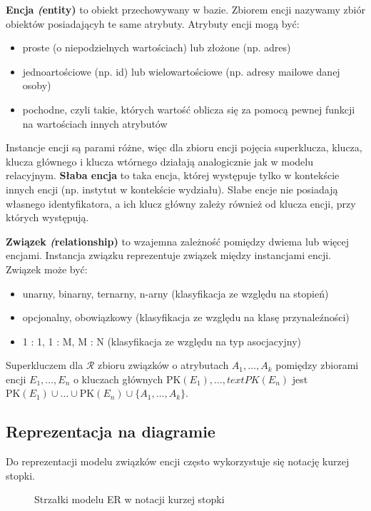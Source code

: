 \textbf{Encja \textit(entity)} to obiekt przechowywany w bazie. Zbiorem encji nazywamy zbiór obiektów posiadającyh te same atrybuty.
Atrybuty encji mogą być:
\begin{itemize}
    \item proste (o niepodzielnych wartościach) lub złożone (np. adres)
    \item jednoartościowe (np. id) lub wielowartościowe (np. adresy mailowe danej osoby)
    \item pochodne, czyli takie, których wartość oblicza się za pomocą pewnej funkcji na wartościach innych atrybutów
\end{itemize}
Instancje encji są parami różne, więc dla zbioru encji pojęcia superklucza, klucza, klucza głównego i klucza wtórnego działają analogicznie jak
w modelu relacyjnym.
\textbf{Słaba encja} to taka encja, której występuje tylko w kontekście innych encji (np. instytut w kontekście wydziału). Słabe encje nie posiadają własnego identyfikatora, a ich klucz główny zależy również od klucza encji, przy których występują.

\textbf{Związek \textit(relationship)} to wzajemna zależność pomiędzy dwiema lub więcej encjami. Instancja związku reprezentuje związek między instancjami encji.
Związek może być:
\begin{itemize}
    \item unarny, binarny, ternarny, n-arny (klasyfikacja ze względu na stopień)
    \item opcjonalny, obowiązkowy (klasyfikacja ze względu na klasę przynaleźności)
    \item 1 : 1, 1 : M, M : N (klasyfikacja ze względu na typ asocjacyjny)
\end{itemize}
Superkluczem dla \( \mathcal{R} \) zbioru związków o atrybutach \( A_1, \dots, A_k \) pomiędzy zbiorami encji \( E_1, \dots, E_n \) o kluczach głównych \( \text{PK}(E_1), \dots, text{PK}(E_n) \)
jest \( \text{PK}(E_1) \cup \ldots \cup \text{PK}(E_n) \cup \{A_1, \dots, A_k\} \).

\subsection*{Reprezentacja na diagramie}
Do reprezentacji modelu związków encji często wykorzystuje się notację kurzej stopki.

\begin{figure}[h!]
    \centering
    
    \caption{Strzałki modelu ER w notacji kurzej stopki}
\end{figure}